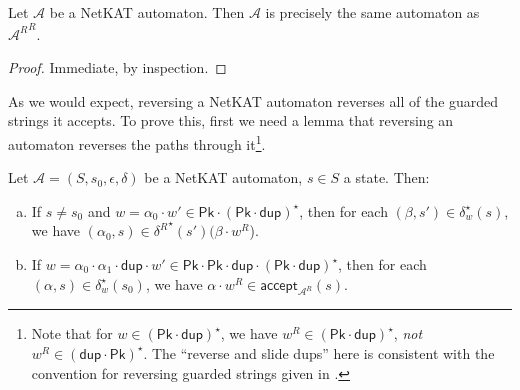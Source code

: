 \documentclass[acmsmall,dvipsnames,nonacm]{acmart}
\newcommand\Pk{\mathsf{Pk}}
\newcommand\pk{\alpha}
\newcommand\pkp{\beta}
\newcommand\dup{\mathsf{dup}}
\newcommand\ddd{\cdot\dup\cdot}
\newcommand\accept{\mathsf{accept}}
\newcommand\NetKAT{\textsf{NetKAT}\xspace}
\begin{document}
\begin{lemma}\label{lem:rev-rev-id}
Let $\mathcal{A}$ be a \NetKAT automaton. Then $\mathcal{A}$ is precisely the
same automaton as ${\mathcal{A}^R}^R$.
\end{lemma}
\begin{proof}
Immediate, by inspection.
\end{proof}


As we would expect, reversing a \NetKAT automaton reverses all of the guarded
strings it accepts. To prove this, first we need a lemma that reversing an
automaton reverses the paths through it\footnote{Note that for $w\in(\Pk\cdot\dup)^\star$, we have
$w^R\in(\Pk\cdot\dup)^\star$, \emph{not} $w^R\in(\dup\cdot\Pk)^\star$. The ``reverse and
slide dups'' here is consistent with the convention for reversing guarded
strings given in .}.
\begin{lemma}\label{lem:paths-reverse}
Let $\mathcal{A} = (S, s_0, \epsilon, \delta)$ be a \NetKAT automaton, $s\in S$ a
state. Then:
\begin{enumerate}[(a)]
\item If $s \neq s_0$ and $w = \pk_0\cdot w' \in \Pk\cdot(\Pk\cdot\dup)^\star$,
                then for each $(\pkp, s') \in \delta^\star_w(s)$, we have
                $(\pk_0, s)\in {\delta^R}^\star (s') (\pkp\cdot w^R$).

\item If $w = \pk_0\cdot \pk_1\ddd w'\in\Pk\cdot\Pk\ddd(\Pk\cdot\dup)^\star$,
                then for each $(\pk, s) \in \delta^\star_w (s_0)$,
                we have $\pk\cdot w^R \in \accept_{\mathcal{A}^R}(s)$.
\end{enumerate}
\end{lemma}
\end{document}
